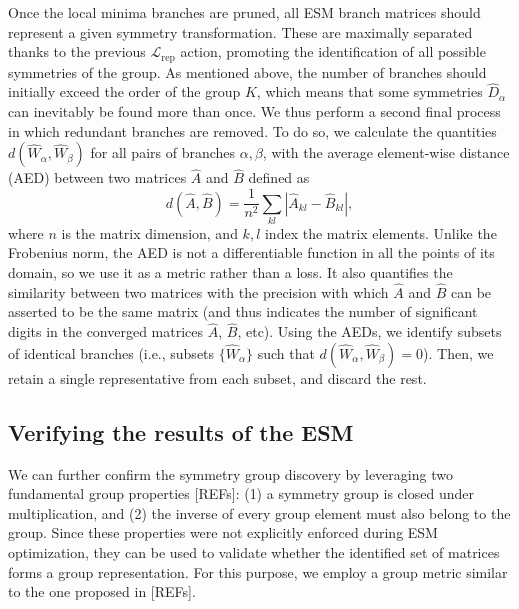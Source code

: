 Once the local minima branches are pruned, all ESM branch matrices should represent a given symmetry transformation. These are maximally separated thanks to the previous $\mathcal{L}_{\mathrm{rep}}$ action, promoting the identification of all possible symmetries of the group. As mentioned above, the number of branches should initially exceed the order of the group $K$, which means that some symmetries $\hat{D}_{\alpha}$ can inevitably be found more than once. We thus perform a second final process in which redundant branches are removed. To do so, we calculate the quantities $d (\hat{W}_{\alpha}, \hat{W}_{\beta})$ for all pairs of branches $\alpha, \beta$, with the average element-wise distance (AED) between two matrices $\hat{A}$ and $\hat{B}$ defined as
\begin{equation}\label{eq:matrix_d}
  d \left( \hat{A} , \hat{B} \right) = \frac{1}{n^2} \sum_{k l} |\hat{A}_{kl} - \hat{B}_{kl}|,
\end{equation}
where $n$ is the matrix dimension, and $k,l$ index the matrix elements. Unlike the Frobenius norm, the AED is not a differentiable function in all the points of its domain, so we use it as a metric rather than a loss. It also quantifies the similarity between two matrices with the precision with which $\hat{A}$ and $\hat{B}$ can be asserted to be the same matrix (and thus indicates the number of significant digits in the converged matrices $\hat{A}$, $\hat{B}$, etc). Using the AEDs, we identify subsets of identical branches (i.e., subsets $\{ \hat{W}_{\alpha}\}$ such that $d (\hat{W}_{\alpha}, \hat{W}_{\beta}) = 0$). Then, we retain a single representative from each subset, and discard the rest.





\subsection{Verifying the results of the ESM}\label{sec:verifying}



We can further confirm the symmetry group discovery by leveraging two fundamental group properties [REFs]: (1) a symmetry group is closed under multiplication, and (2) the inverse of every group element must also belong to the group. Since these properties were not explicitly enforced during ESM optimization, they can be used to validate whether the identified set of matrices forms a group representation. For this purpose, we employ a group metric similar to the one proposed in [REFs].

